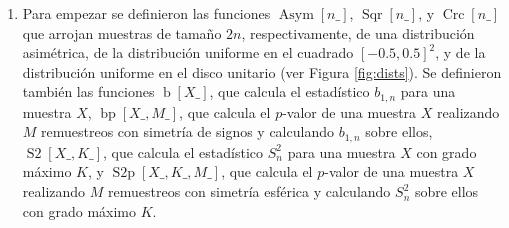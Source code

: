 \documentclass[letter]{article}
\begin{document}
\begin{enumerate}
\setcounter{enumi}{0}

\item Para empezar se definieron las funciones $\operatorname{Asym}[n\_]$, $\operatorname{Sqr}[n\_]$, y $\operatorname{Crc}[n\_]$ que arrojan muestras de tamaño $2n$, respectivamente, de una distribución asimétrica, de la distribución uniforme en el cuadrado $[-0.5,0.5]^2$, y de la distribución uniforme en el disco unitario (ver Figura \ref{fig:dists}). Se definieron también las funciones $\operatorname{b}[X\_]$, que calcula el estadístico $b_{1,n}$ para una muestra $X$, $\operatorname{bp}[X\_,M\_]$, que calcula el $p$-valor de una muestra $X$ realizando $M$ remuestreos con simetría de signos y calculando $b_{1,n}$ sobre ellos, $\operatorname{S2}[X\_,K\_]$, que calcula el estadístico $S^2_n$ para una muestra $X$ con grado máximo $K$, y $\operatorname{S2p}[X\_,K\_,M\_]$, que calcula el $p$-valor de una muestra $X$ realizando $M$ remuestreos con simetría esférica y calculando $S^2_n$ sobre ellos con grado máximo $K$.


\end{enumerate}
\end{document}

